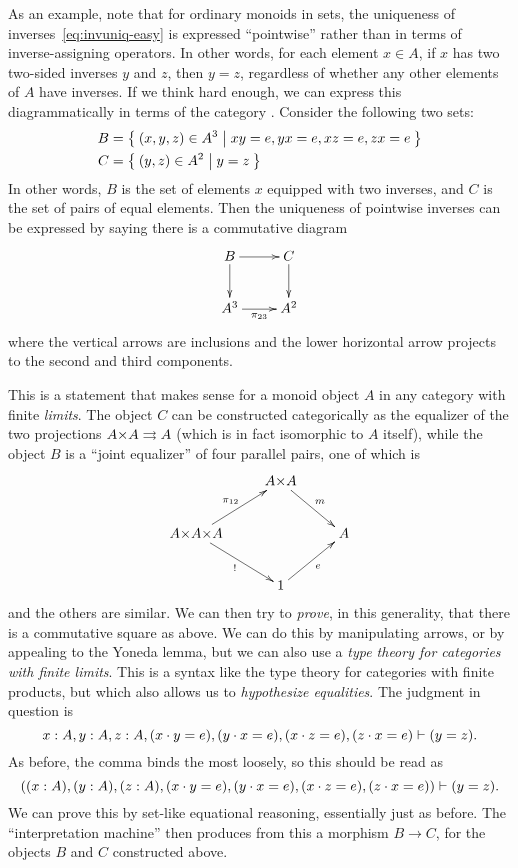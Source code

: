 As an example, note that for ordinary monoids in sets, the uniqueness of inverses~\eqref{eq:invuniq-easy} is expressed ``pointwise'' rather than in terms of inverse-assigning operators.
In other words, for each element $x\in A$, if $x$ has two two-sided inverses $y$ and $z$, then $y=z$, regardless of whether any other elements of $A$ have inverses.
If we think hard enough, we can express this diagrammatically in terms of the category \bSet.
Consider the following two sets:
\begin{align*}
  B &= \Set{(x,y,z)\in A^3 | xy=e, yx=e, xz=e, zx=e}\\
  C &= \Set{(y,z)\in A^2 | y=z}
\end{align*}
In other words, $B$ is the set of elements $x$ equipped with two inverses, and $C$ is the set of pairs of equal elements.
Then the uniqueness of pointwise inverses can be expressed by saying there is a commutative diagram
\[ \xymatrix{ B \ar[d] \ar[r] & C \ar[d] \\ A^3 \ar[r]_{\pi_{23}} & A^2 } \]
where the vertical arrows are inclusions and the lower horizontal arrow projects to the second and third components.

This is a statement that makes sense for a monoid object $A$ in any category with finite \emph{limits}.
The object $C$ can be constructed categorically as the equalizer of the two projections $A\times A \toto A$ (which is in fact isomorphic to $A$ itself), while the object $B$ is a ``joint equalizer'' of four parallel pairs, one of which is
\[ \vcenter{\xymatrix{ & A \times A \ar[dr]^m \\
    A\times A\times A \ar[ur]^{\pi_{12}} \ar[dr]_{!} && A \\
    & 1 \ar[ur]_e }} \]
and the others are similar.
We can then try to \emph{prove}, in this generality, that there is a commutative square as above.
We can do this by manipulating arrows, or by appealing to the Yoneda lemma, but we can also use a \emph{type theory for categories with finite limits}.
This is a syntax like the type theory for categories with finite products, but which also allows us to \emph{hypothesize equalities}.
The judgment in question is
\begin{equation}\label{eq:pointwise-unique-inverses}
  x:A, y:A, z:A, (x\cdot y = e), (y\cdot x=e), (x\cdot z = e), (z\cdot x = e) \types (y=z).
\end{equation}
As before, the comma binds the most loosely, so this should be read as
\[ ((x:A), (y:A), (z:A), (x\cdot y = e), (y\cdot x=e), (x\cdot z = e), (z\cdot x = e)) \vdash (y=z). \]
We can prove this by set-like equational reasoning, essentially just as before.
The ``interpretation machine'' then produces from this a morphism $B\to C$, for the objects $B$ and $C$ constructed above.

